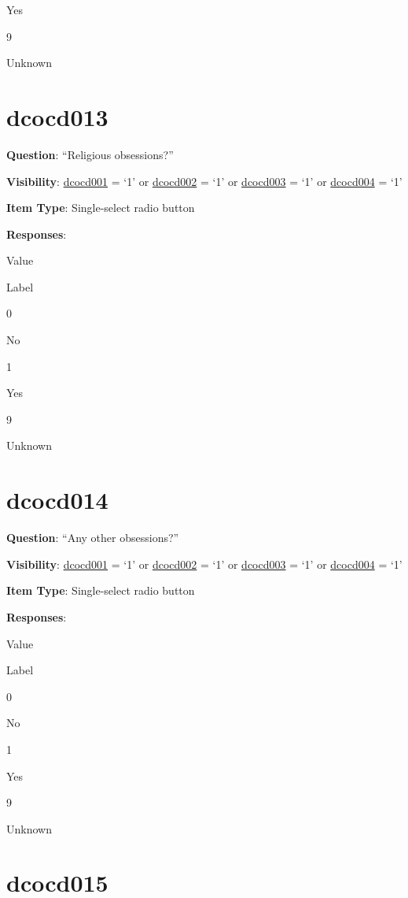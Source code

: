 \documentclass[]{book}
\begin{document}
Yes

9

Unknown

\hypertarget{dcocd013}{%
\section{dcocd013}\label{dcocd013}}

\textbf{Question}: ``Religious obsessions?''

\textbf{Visibility}: \protect\hyperlink{dcocd001}{dcocd001} = `1' or \protect\hyperlink{dcocd002}{dcocd002} = `1' or \protect\hyperlink{dcocd003}{dcocd003} = `1' or \protect\hyperlink{dcocd004}{dcocd004} = `1'

\textbf{Item Type}: Single-select radio button

\textbf{Responses}:

Value

Label

0

No

1

Yes

9

Unknown

\hypertarget{dcocd014}{%
\section{dcocd014}\label{dcocd014}}

\textbf{Question}: ``Any other obsessions?''

\textbf{Visibility}: \protect\hyperlink{dcocd001}{dcocd001} = `1' or \protect\hyperlink{dcocd002}{dcocd002} = `1' or \protect\hyperlink{dcocd003}{dcocd003} = `1' or \protect\hyperlink{dcocd004}{dcocd004} = `1'

\textbf{Item Type}: Single-select radio button

\textbf{Responses}:

Value

Label

0

No

1

Yes

9

Unknown

\hypertarget{dcocd015}{%
\section{dcocd015}\label{dcocd015}}
\end{document}
